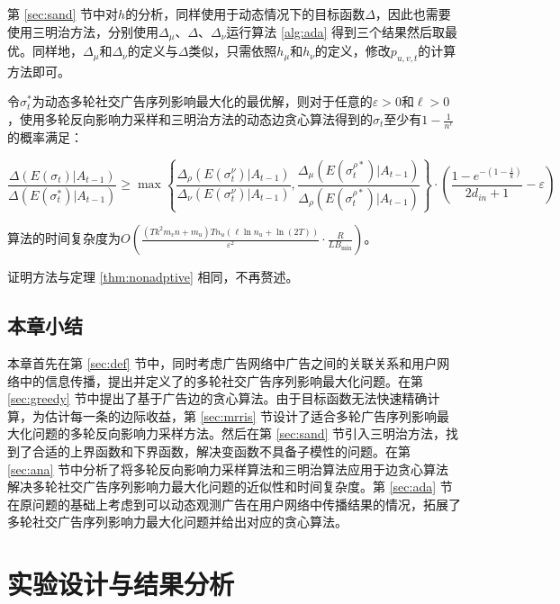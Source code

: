第 \ref{sec:sand} 节中对$h$的分析，同样使用于动态情况下的目标函数$\Delta$，因此也需要使用三明治方法，分别使用$\Delta_\mu$、$\Delta$、$\Delta_\nu$运行算法 \ref{alg:ada} 得到三个结果然后取最优。同样地，$\Delta_\mu$和$\Delta_\nu$的定义与$\Delta$类似，只需依照$h_\mu$和$h_\nu$的定义，修改$p_{u,v,t}$的计算方法即可。

\begin{theorem}
令$\sigma_t^*$为动态多轮社交广告序列影响最大化的最优解，则对于任意的$\varepsilon>0$和$\ell > 0$，使用多轮反向影响力采样和三明治方法的动态边贪心算法得到的$\sigma_t$至少有$1-\frac{1}{n^{\ell}}$的概率满足：

\begin{equation}
    \frac{\Delta(E(\sigma_t) | A_{t-1})}{\Delta(E(\sigma_t^*) | A_{t-1})}
    \ge \max\left\{\frac{\Delta_\rho(E(\sigma_t^\nu) | A_{t-1} )}{\Delta_\nu(E(\sigma_t^\nu) | A_{t-1})},\frac{\Delta_\mu(E(\sigma_t^{\rho*})  | A_{t-1})}{\Delta_\rho(E(\sigma_t^{\rho*}) | A_{t-1})} \right\}
    \cdot\left(\frac{1-e^{-(1-\frac{1}{k})}}{2d_{in}+1}-\varepsilon\right)
\end{equation}

\noindent 算法的时间复杂度为$O\left(\frac{(Tk^2 m_v n + m_u)Tn_u(\ell \ln n_u + \ln (2T))}{\varepsilon^2}\cdot\frac{R}{LB_{\min}}\right)$。
\end{theorem}
证明方法与定理 \ref{thm:nonadptive} 相同，不再赘述。

\section{本章小结}

本章首先在第 \ref{sec:def} 节中，同时考虑广告网络中广告之间的关联关系和用户网络中的信息传播，提出并定义了的多轮社交广告序列影响最大化问题。在第 \ref{sec:greedy} 节中提出了基于广告边的贪心算法。由于目标函数无法快速精确计算，为估计每一条的边际收益，第 \ref{sec:mrris} 节设计了适合多轮广告序列影响最大化问题的多轮反向影响力采样方法。然后在第 \ref{sec:sand} 节引入三明治方法，找到了合适的上界函数和下界函数，解决变函数不具备子模性的问题。在第 \ref{sec:ana} 节中分析了将多轮反向影响力采样算法和三明治算法应用于边贪心算法解决多轮社交广告序列影响力最大化问题的近似性和时间复杂度。第 \ref{sec:ada} 节在原问题的基础上考虑到可以动态观测广告在用户网络中传播结果的情况，拓展了多轮社交广告序列影响力最大化问题并给出对应的贪心算法。

\chapter{实验设计与结果分析}


